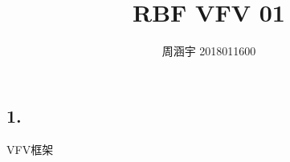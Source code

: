 \documentclass[UTF8,c5size]{ctexart}
\title{{\bfseries RBF VFV 01}}
\author{周涵宇 2018011600}
\date{}
\begin{document}
\maketitle



\subsection*{1.}

VFV框架
\end{document}
